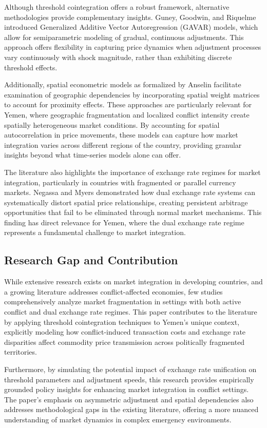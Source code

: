 Although threshold cointegration offers a robust framework, alternative methodologies provide complementary insights. Guney, Goodwin, and Riquelme introduced Generalized Additive Vector Autoregression (GAVAR) models, which allow for semiparametric modeling of gradual, continuous adjustments.\autocite{guney2019} This approach offers flexibility in capturing price dynamics when adjustment processes vary continuously with shock magnitude, rather than exhibiting discrete threshold effects.

Additionally, spatial econometric models as formalized by Anselin facilitate examination of geographic dependencies by incorporating spatial weight matrices to account for proximity effects.\autocite{anselin1988} These approaches are particularly relevant for Yemen, where geographic fragmentation and localized conflict intensity create spatially heterogeneous market conditions. By accounting for spatial autocorrelation in price movements, these models can capture how market integration varies across different regions of the country, providing granular insights beyond what time-series models alone can offer.

The literature also highlights the importance of exchange rate regimes for market integration, particularly in countries with fragmented or parallel currency markets. Negassa and Myers demonstrated how dual exchange rate systems can systematically distort spatial price relationships, creating persistent arbitrage opportunities that fail to be eliminated through normal market mechanisms.\autocite{negassa2007} This finding has direct relevance for Yemen, where the dual exchange rate regime represents a fundamental challenge to market integration.

\subsection{Research Gap and Contribution}

While extensive research exists on market integration in developing countries, and a growing literature addresses conflict-affected economies, few studies comprehensively analyze market fragmentation in settings with both active conflict and dual exchange rate regimes. This paper contributes to the literature by applying threshold cointegration techniques to Yemen's unique context, explicitly modeling how conflict-induced transaction costs and exchange rate disparities affect commodity price transmission across politically fragmented territories.

Furthermore, by simulating the potential impact of exchange rate unification on threshold parameters and adjustment speeds, this research provides empirically grounded policy insights for enhancing market integration in conflict settings. The paper's emphasis on asymmetric adjustment and spatial dependencies also addresses methodological gaps in the existing literature, offering a more nuanced understanding of market dynamics in complex emergency environments.